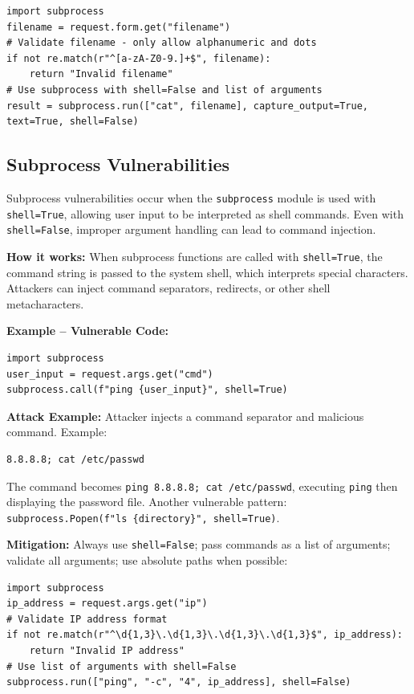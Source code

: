\begin{lstlisting}[style=pycode]
import subprocess
filename = request.form.get("filename")
# Validate filename - only allow alphanumeric and dots
if not re.match(r"^[a-zA-Z0-9.]+$", filename):
    return "Invalid filename"
# Use subprocess with shell=False and list of arguments
result = subprocess.run(["cat", filename], capture_output=True, text=True, shell=False)
\end{lstlisting}

\subsection{Subprocess Vulnerabilities}
\label{sec:cmd_subprocess}

Subprocess vulnerabilities occur when the \texttt{subprocess} module is used with \texttt{shell=True}, allowing user input to be interpreted as shell commands. Even with \texttt{shell=False}, improper argument handling can lead to command injection.

\textbf{How it works:} When subprocess functions are called with \texttt{shell=True}, the command string is passed to the system shell, which interprets special characters. Attackers can inject command separators, redirects, or other shell metacharacters.

\textbf{Example -- Vulnerable Code:}

\begin{lstlisting}[style=pycode]
import subprocess
user_input = request.args.get("cmd")
subprocess.call(f"ping {user_input}", shell=True)
\end{lstlisting}

\textbf{Attack Example:} Attacker injects a command separator and malicious command. Example:
\begin{lstlisting}[style=attackcode]
8.8.8.8; cat /etc/passwd
\end{lstlisting}
The command becomes \texttt{ping 8.8.8.8; cat /etc/passwd}, executing \texttt{ping} then displaying the password file. Another vulnerable pattern: \texttt{subprocess.Popen(f"ls \{directory\}", shell=True)}.

\textbf{Mitigation:} Always use \texttt{shell=False}; pass commands as a list of arguments; validate all arguments; use absolute paths when possible:

\begin{lstlisting}[style=pycode]
import subprocess
ip_address = request.args.get("ip")
# Validate IP address format
if not re.match(r"^\d{1,3}\.\d{1,3}\.\d{1,3}\.\d{1,3}$", ip_address):
    return "Invalid IP address"
# Use list of arguments with shell=False
subprocess.run(["ping", "-c", "4", ip_address], shell=False)
\end{lstlisting}


